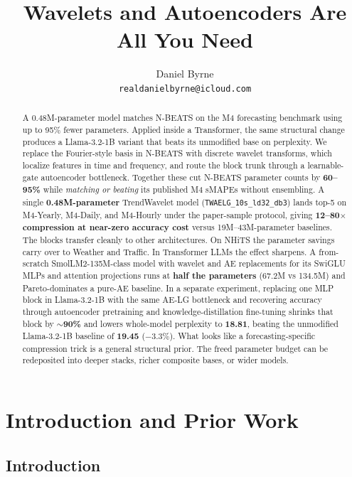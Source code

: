 \documentclass{article}
\title{Wavelets and Autoencoders Are All You Need}
\author{%
  Daniel Byrne \\
  \texttt{realdanielbyrne@icloud.com} \\
}
\begin{document}
\maketitle

\begin{abstract}
A 0.48M-parameter model matches N-BEATS on the M4 forecasting benchmark using up to 95\% fewer parameters. Applied inside a Transformer, the same structural change produces a Llama-3.2-1B variant that beats its unmodified base on perplexity. We replace the Fourier-style basis in N-BEATS \citep{oreshkin2020nbeats} with discrete wavelet transforms, which localize features in time and frequency, and route the block trunk through a learnable-gate autoencoder bottleneck. Together these cut N-BEATS parameter counts by \textbf{60--95\%} while \emph{matching or beating} its published M4 sMAPEs without ensembling. A single \textbf{0.48M-parameter} TrendWavelet model (\texttt{TWAELG\_10s\_ld32\_db3}) lands top-5 on M4-Yearly, M4-Daily, and M4-Hourly under the paper-sample protocol, giving \textbf{12--80$\times$ compression at near-zero accuracy cost} versus 19M--43M-parameter baselines. The blocks transfer cleanly to other architectures. On NHiTS the parameter savings carry over to Weather and Traffic. In Transformer LLMs the effect sharpens. A from-scratch SmolLM2-135M-class model with wavelet and AE replacements for its SwiGLU MLPs and attention projections runs at \textbf{half the parameters} (67.2M vs 134.5M) and Pareto-dominates a pure-AE baseline. In a separate experiment, replacing one MLP block in Llama-3.2-1B with the same AE-LG bottleneck and recovering accuracy through autoencoder pretraining and knowledge-distillation fine-tuning shrinks that block by \textbf{$\sim$90\%} and lowers whole-model perplexity to \textbf{18.81}, beating the unmodified Llama-3.2-1B baseline of \textbf{19.45} ($-3.3\%$). What looks like a forecasting-specific compression trick is a general structural prior. The freed parameter budget can be redeposited into deeper stacks, richer composite bases, or wider models.
\end{abstract}


\section{Introduction and Prior Work}
\label{sec:intro}

\subsection{Introduction}
\end{document}
